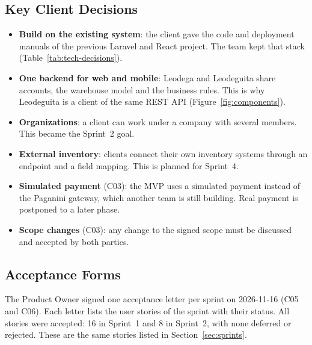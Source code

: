 \subsection{Key Client Decisions}

\begin{itemize}
  \item \textbf{Build on the existing system}: the client gave the code and deployment manuals of the previous Laravel and React project.
        The team kept that stack (Table~\ref{tab:tech-decisions}).
  \item \textbf{One backend for web and mobile}: Leodega and Leodeguita share accounts, the warehouse model and the business rules.
        This is why Leodeguita is a client of the same REST API (Figure~\ref{fig:components}).
  \item \textbf{Organizations}: a client can work under a company with several members.
        This became the Sprint~2 goal.
  \item \textbf{External inventory}: clients connect their own inventory systems through an endpoint and a field mapping.
        This is planned for Sprint~4.
  \item \textbf{Simulated payment} (C03): the MVP uses a simulated payment instead of the Paganini gateway, which another team is still building.
        Real payment is postponed to a later phase.
  \item \textbf{Scope changes} (C03): any change to the signed scope must be discussed and accepted by both parties.
\end{itemize}

\subsection{Acceptance Forms}

The Product Owner signed one acceptance letter per sprint on 2026-11-16 (C05 and C06).
Each letter lists the user stories of the sprint with their status.
All stories were accepted: 16 in Sprint~1 and 8 in Sprint~2, with none deferred or rejected.
These are the same stories listed in Section~\ref{sec:sprints}.



